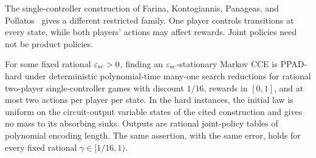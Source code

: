 The single-controller construction of Farina, Kontogiannis, Panageas,
and Pollatos~\cite{FKPP2026} gives a different restricted family.
One player controls transitions at every state, while both players'
actions may affect rewards. Joint policies need not be product policies.

\begin{corollary}
\label{cor:single-controller-hardness}
For some fixed rational $\varepsilon_{\rm sc}>0$, finding an
$\varepsilon_{\rm sc}$-stationary Markov CCE is PPAD-hard under deterministic
polynomial-time many-one search reductions for rational two-player
single-controller games with discount $1/16$, rewards in $[0,1]$,
and at most two actions per player per state. In the hard instances,
the initial law is uniform on the circuit-output variable states of
the cited construction and gives no mass to its absorbing sinks.
Outputs are rational joint-policy tables of polynomial encoding length.
The same assertion, with the same error, holds for every fixed rational
$\gamma\in[1/16,1)$.
\end{corollary}

